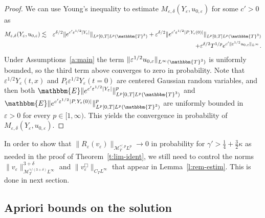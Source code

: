 \begin{proof}
  We can use Young's inequality to estimate $M_{\varepsilon, \delta}
  (Y_{\varepsilon}, u_{0, \varepsilon})$ for some $c' > 0$ as
  \begin{eqnarray*}
    M_{\varepsilon, \delta} (Y_{\varepsilon}, u_{0, \varepsilon}) & \lesssim &
    \varepsilon^{\delta / 2} \|e^{c' \varepsilon^{1 / 2}  | Y_{\varepsilon} |}
    \|_{L^p [0, T] L^p (\mathbbm{T}^3)} + \varepsilon^{\delta / 2} \|e^{c'
    \varepsilon^{1 / 2}  | P_{\point} Y_{\varepsilon} (0) |} \|_{L^p [0, T]
    L^p (\mathbbm{T}^3)}\\
    &  & + \varepsilon^{\delta / 2} T^{1 / p} e^{c'  \| \varepsilon^{1 / 2}
    u_{0, \varepsilon} \|_{L^{\infty}}} .
  \end{eqnarray*}
  Under Assumptions~\ref{a:main} the term $\| \varepsilon^{1 / 2} u_{0,
  \varepsilon} \|_{L^{\infty} (\mathbbm{T}^3)}$ is uniformly bounded, so the
  third term above converges to zero in probability. Note that $\varepsilon^{1
  / 2} Y_{\varepsilon} (t, x)$ and $P_t \varepsilon^{1 / 2} Y_{\varepsilon} (t
  = 0)$ are centered Gaussian random variables, and then both $\mathbbm{E}
  \|e^{c' \varepsilon^{1 / 2}  | Y_{\varepsilon} |} \|^p_{L^p [0, T] L^p
  (\mathbbm{T}^3)}$ and $\mathbbm{E} \|e^{c' \varepsilon^{1 / 2}  | P_{\point}
  Y_{\varepsilon} (0) |} \|^p_{L^p [0, T] L^p (\mathbbm{T}^3)}$ are uniformly
  bounded in $\varepsilon > 0$ for every $p \in [1, \infty)$. This yields the
  convergence in probability of $M_{\varepsilon, \delta} (Y_{\varepsilon},
  u_{0, \varepsilon})$.
\end{proof}

In order to show that $\| R_{\varepsilon} (v_{\varepsilon})
\|_{\mathcal{M}^{\gamma', p}_T L^p} \rightarrow 0$ in probability for $\gamma'
> \frac{1}{4} + \frac{3}{2} \kappa$ as needed in the proof of
Theorem~\ref{t:lim-ident}, we still need to control the norms $\|
v_{\varepsilon} \|^{3 + \delta}_{\mathcal{M}_T^{\gamma / (3 + \delta)}
L^{\infty}}$ and $\|v^{\Box}_{\varepsilon} \|_{C_T L^{\infty}}$ that appear in
Lemma~\ref{l:rem-estim}. This is done in next section.

\subsection{Apriori bounds on the solution}\label{s:a-priori}


